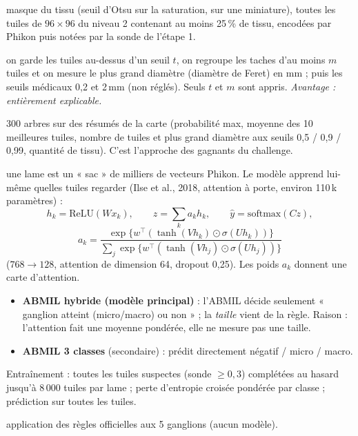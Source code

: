 \documentclass[11pt,a4paper]{article}
\begin{document}
\begin{description}[style=nextline]
  \item[1. Carte de chaleur] masque du tissu (seuil d'Otsu sur la saturation, sur une miniature), toutes les tuiles de $96\times96$
        du niveau 2 contenant au moins 25\,\% de tissu, encodées par Phikon puis notées par la sonde de l'étape 1.
  \item[2a. Règle de taille] on garde les tuiles au-dessus d'un seuil $t$, on regroupe les taches d'au moins $m$ tuiles et on mesure
        le plus grand diamètre (diamètre de Feret) en mm ; puis les seuils médicaux 0,2 et 2\,mm (non réglés). Seuls $t$ et $m$ sont appris.
        \emph{Avantage : entièrement explicable.}
  \item[2b. Forêt aléatoire] 300 arbres sur des résumés de la carte (probabilité max, moyenne des 10 meilleures tuiles, nombre de
        tuiles et plus grand diamètre aux seuils 0,5 / 0,9 / 0,99, quantité de tissu). C'est l'approche des gagnants du challenge.
  \item[2c. ABMIL (apprentissage multi-instances par attention)] une lame est un « sac » de milliers de vecteurs Phikon. Le modèle
        apprend lui-même quelles tuiles regarder (Ilse et al., 2018, attention à porte, environ 110\,k paramètres) :
        \[
          h_k = \mathrm{ReLU}(W x_k), \qquad z = \sum_k a_k h_k, \qquad \hat y = \mathrm{softmax}(C z),
        \]
        \[
          a_k = \frac{\exp\{w^\top(\tanh(V h_k) \odot \sigma(U h_k))\}}{\sum_j \exp\{w^\top(\tanh(V h_j) \odot \sigma(U h_j))\}}
        \]
        ($768 \to 128$, attention de dimension 64, dropout 0,25). Les poids $a_k$ donnent une carte d'attention.
        \begin{itemize}
          \item \textbf{ABMIL hybride (modèle principal)} : l'ABMIL décide seulement « ganglion atteint (micro/macro) ou non » ;
                la \emph{taille} vient de la règle. Raison : l'attention fait une moyenne pondérée, elle ne mesure pas une taille.
          \item \textbf{ABMIL 3 classes} (secondaire) : prédit directement négatif / micro / macro.
        \end{itemize}
        Entraînement : toutes les tuiles suspectes (sonde $\geq 0{,}3$) complétées au hasard jusqu'à 8\,000 tuiles par lame ;
        perte d'entropie croisée pondérée par classe ; prédiction sur toutes les tuiles.
  \item[3. Stade pN] application des règles officielles aux 5 ganglions (aucun modèle).
\end{description}
\end{document}
